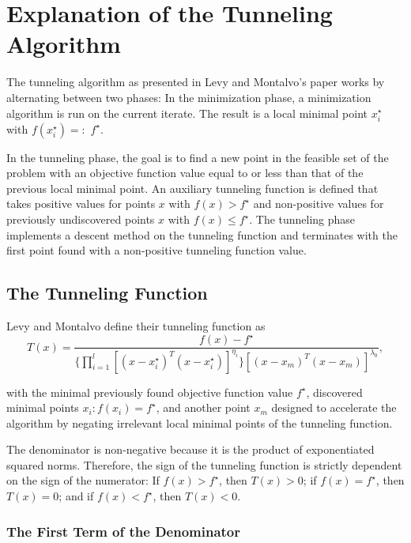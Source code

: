 \documentclass[a4paper,12pt,twoside]{article}
\begin{document}
\section{Explanation of the Tunneling Algorithm}

The tunneling algorithm as presented in Levy and Montalvo's paper \cite{levy_tunneling_1985} works by alternating between two phases: In the minimization phase, a minimization algorithm is run on the current iterate. The result is a local minimal point $x_i^\star$ with $f(x_i^\star) =:$ $f^\star$.

In the tunneling phase, the goal is to find a new point in the feasible set of the problem with an objective function value equal to or less than that of the previous local minimal point. An auxiliary tunneling function is defined that takes positive values for points $x$ with $f(x) > f^\star$ and non-positive values for previously undiscovered points $x$ with $f(x) \leq f^\star$. The tunneling phase implements a descent method on the tunneling function and terminates with the first point found with a non-positive tunneling function value.



\subsection{The Tunneling Function}
Levy and Montalvo define their tunneling function as \cite[Eq. A.4]{levy_tunneling_1985}
\begin{equation} \label{eq:t}
    T(x) = \frac{
        f(x) - f^\star}{ 
        \{ \prod_{i = 1}^l [(x - x^\star_i)^T(x - x^\star_i)]^{\eta_i} \} 
        [(x-x_m)^T(x-x_m)]^{\lambda_0}},
\end{equation}

with the minimal previously found objective function value $f^\star$, discovered minimal points $x_i: f(x_i) = f^\star$, and another point $x_m$ designed to accelerate the algorithm by negating irrelevant local minimal points of the tunneling function. 

The denominator is non-negative because it is the product of exponentiated squared norms. Therefore, the sign of the tunneling function is strictly dependent on the sign of the numerator: If $f(x) > f^\star$, then $T(x) > 0$; if $f(x) = f^\star$, then $T(x) = 0$; and if $f(x) < f^\star$, then $T(x) < 0$.

\subsubsection{The First Term of the Denominator}
\end{document}
